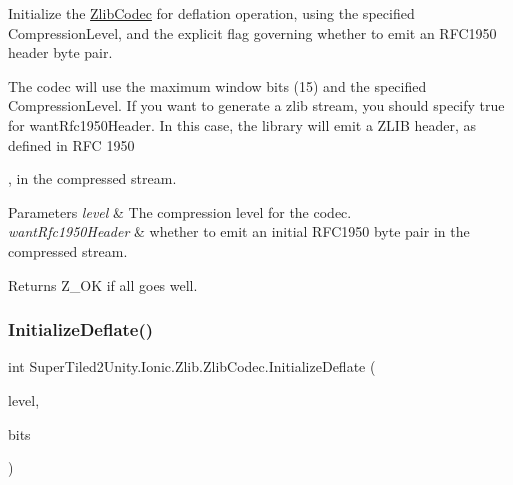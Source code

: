 Initialize the \mbox{\hyperlink{class_super_tiled2_unity_1_1_ionic_1_1_zlib_1_1_zlib_codec}{Zlib\+Codec}} for deflation operation, using the specified Compression\+Level, and the explicit flag governing whether to emit an R\+F\+C1950 header byte pair. 

The codec will use the maximum window bits (15) and the specified Compression\+Level. If you want to generate a zlib stream, you should specify true for want\+Rfc1950\+Header. In this case, the library will emit a Z\+L\+IB header, as defined in R\+FC 1950

, in the compressed stream. ~\newline



\begin{DoxyParams}{Parameters}
{\em level} & The compression level for the codec.\\
\hline
{\em want\+Rfc1950\+Header} & whether to emit an initial R\+F\+C1950 byte pair in the compressed stream.\\
\hline
\end{DoxyParams}
\begin{DoxyReturn}{Returns}
Z\+\_\+\+OK if all goes well.
\end{DoxyReturn}
\mbox{\label{class_super_tiled2_unity_1_1_ionic_1_1_zlib_1_1_zlib_codec_a329599d94558959d401bef274faf3842}} 
\subsubsection{\texorpdfstring{Initialize\+Deflate()}{InitializeDeflate()}\hspace{0.1cm}{\footnotesize\ttfamily [4/5]}}
{\footnotesize\ttfamily int Super\+Tiled2\+Unity.\+Ionic.\+Zlib.\+Zlib\+Codec.\+Initialize\+Deflate (\begin{DoxyParamCaption}\item[{\mbox{\hyperlink{namespace_super_tiled2_unity_1_1_ionic_1_1_zlib_a20f6771804996c363f454ad9765cd7db}{Compression\+Level}}}]{level,  }\item[{int}]{bits }\end{DoxyParamCaption})}



